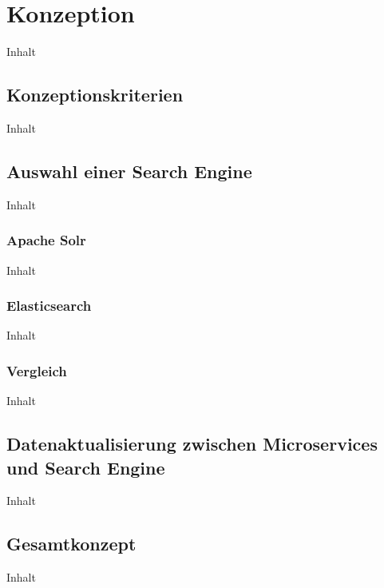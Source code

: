 \chapter{Konzeption\label{chap4:Viertes-Kapitel}}

Inhalt

\section{Konzeptionskriterien\label{sec4.1:Unterpunkt-1}}

Inhalt

\section{Auswahl einer Search Engine\label{sec4.2:Unterpunkt-2}}

Inhalt

\subsection{Apache Solr\label{subsec4.2.1:Unterunterpunkt-1}}

Inhalt

\subsection{Elasticsearch\label{subsec4.2.2:Unterunterpunkt-2}}

Inhalt

\subsection{Vergleich\label{subsec4.2.3:Unterunterpunkt-3}}

Inhalt

\section{Datenaktualisierung zwischen Microservices und Search Engine\label{sec4.3:Unterpunkt-3}}

Inhalt

\section{Gesamtkonzept\label{sec4.4:Unterpunkt-4}}

Inhalt